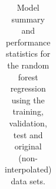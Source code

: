 \documentclass[
  number]{elsarticle}
\begin{document}
\begin{longtable}[]{@{}
  >{\centering\arraybackslash}p{}
  >{\centering\arraybackslash}p{}
  >{\centering\arraybackslash}p{}
  >{\centering\arraybackslash}p{}
  >{\centering\arraybackslash}p{}
  >{\centering\arraybackslash}p{}
  >{\centering\arraybackslash}p{}
  >{\centering\arraybackslash}p{}
  >{\centering\arraybackslash}p{}@{}}

\caption{\label{tbl-rf-summary}Model summary and performance statistics
for the random forest regression using the training, validation, test
and original (non-interpolated) data sets.}

\tabularnewline


\end{longtable}
\end{document}

